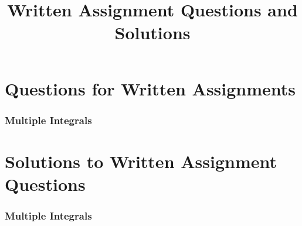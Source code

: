 \documentclass{article}
\title{Written Assignment Questions and Solutions}
\date{}
\author{}
\begin{document}
\maketitle
\tableofcontents 

\part{Questions for Written Assignments}

\setcounter{section}{1}

\section{Multiple Integrals}


\newpage
\part{Solutions to Written Assignment Questions}
\setcounter{section}{1}
%
%

\section{Multiple Integrals}

\end{document}
